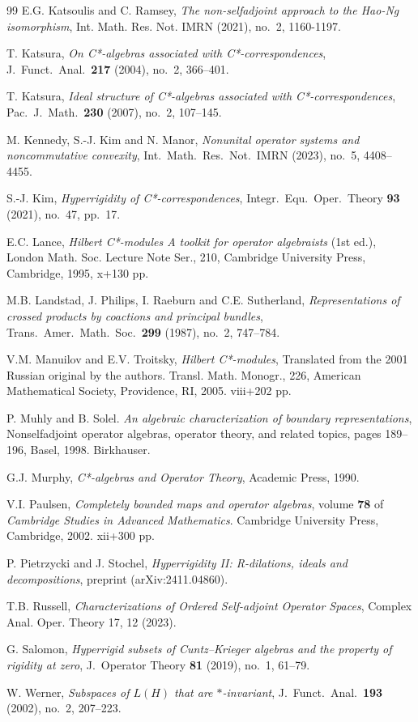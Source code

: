 \documentclass[11pt, draft]{amsart}
\numberwithin{equation}{section}
\theoremstyle{plain}
\theoremstyle{definition}
\theoremstyle{remark}
\begin{document}
\begin{thebibliography}{99}
 E.G. Katsoulis and C. Ramsey,
\textit{The non-selfadjoint approach to the Hao-Ng isomorphism},
Int. Math. Res. Not. IMRN (2021), no.\ 2, 1160-1197.

 T. Katsura,
\textit{On C*-algebras associated with C*-correspondences},
J.\ Funct.\ Anal.\ \textbf{217} (2004), no.\ 2, 366--401.

 T. Katsura,
\textit{Ideal structure of C*-algebras associated with C*-correspondences},
Pac.\ J.\ Math.\ \textbf{230} (2007), no.\ 2, 107--145.

 M. Kennedy, S.-J. Kim and N. Manor,
\textit{Nonunital operator systems and noncommutative convexity},
Int.\ Math.\ Res.\ Not.\ IMRN (2023), no.\ 5, 4408--4455.

 S.-J. Kim,
\textit{Hyperrigidity of C*-correspondences},
Integr.\ Equ.\ Oper.\ Theory \textbf{93} (2021), no.\ 47, pp.\ 17.

 E.C. Lance,
\textit{Hilbert C*-modules A toolkit for operator algebraists} (1st ed.),
London Math. Soc. Lecture Note Ser., 210,
Cambridge University Press, Cambridge, 1995, x+130 pp.

 M.B. Landstad, J. Philips, I. Raeburn and C.E. Sutherland,
\textit{Representations of crossed products by coactions and principal bundles}, 
Trans.\ Amer.\ Math.\ Soc.\ \textbf{299} (1987), no.\ 2, 747--784.

 V.M. Manuilov and E.V. Troitsky,
\textit{Hilbert C*-modules},
Translated from the 2001 Russian original by the authors.
Transl. Math. Monogr., 226, American Mathematical Society, Providence, RI, 2005. viii+202 pp.

 P. Muhly and B. Solel. 
\textit{An algebraic characterization of boundary representations},
Nonselfadjoint operator algebras, operator theory, and related topics,
pages 189–196, Basel, 1998. Birkhauser.

 G.J. Murphy,
\textit{C*-algebras and Operator Theory},
Academic Press, 1990.

 V.I. Paulsen,
\textit{Completely bounded maps and operator algebras}, 
volume \textbf{78} of \textit{Cambridge Studies in Advanced Mathematics}.
Cambridge University Press, Cambridge, 2002. xii+300 pp.

 P. Pietrzycki and J. Stochel,
\textit{Hyperrigidity II: R-dilations, ideals and decompositions},
preprint (arXiv:2411.04860).

 T.B. Russell, \textit{Characterizations of Ordered Self-adjoint Operator Spaces}, Complex Anal. Oper. Theory 17, 12 (2023).

 G. Salomon,
\textit{Hyperrigid subsets of Cuntz–Krieger algebras and the property of rigidity at zero},
J.\ Operator Theory \textbf{81} (2019), no.\ 1, 61--79.

 W. Werner, 
\textit{Subspaces of $L(H)$ that are $*$-invariant}, 
J.\ Funct.\ Anal.\ \textbf{193} (2002), no.\ 2, 207--223.


\end{thebibliography}
\end{document}
